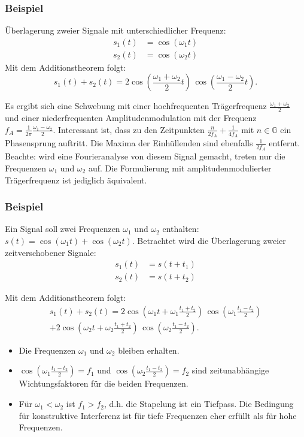 \subsubsection*{Beispiel}
Überlagerung zweier Signale mit unterschiedlicher Frequenz:
\begin{align*}
s_1(t) & = \cos(\omega_1 t)\\
s_2(t) &= \cos(\omega_2 t)
\end{align*}
Mit dem Additionstheorem folgt:
\begin{equation}
s_1(t)+s_2(t)= 2 \cos \left(\frac{\omega_1+\omega_2}{2}t\right)\, \cos \left(\frac{\omega_1-\omega_2}{2}t\right).
\end{equation}

Es ergibt sich eine Schwebung mit einer hochfrequenten Trägerfrequenz $\frac{\omega_1+\omega_2}{2}$ und einer niederfrequenten Amplitudenmodulation mit der Frequenz $f_A = \frac{1}{2\pi}\frac{\omega_1-\omega_2}{2}$. Interessant ist, dass zu den Zeitpunkten $\frac{n}{2f_A}+\frac{1}{4f_A}$ mit $n \in \mathbb{G}$ ein Phasensprung auftritt. Die Maxima der Einhüllenden sind ebenfalls $\frac{1}{2f_A}$ entfernt. Beachte: wird eine Fourieranalyse von diesem Signal gemacht, treten nur die Frequenzen $\omega_1$ und $\omega_2$ auf. Die Formulierung mit amplitudenmodulierter Trägerfrequenz ist jediglich äquivalent.\\ 

\subsubsection*{Beispiel}
Ein Signal soll zwei Frequenzen $\omega_1$ und $\omega_2$ enthalten: $s(t) = \cos (\omega_1t) + \cos(\omega_2t)$. Betrachtet wird die Überlagerung zweier zeitverschobener Signale:
\begin{align*}
s_1(t) &=s(t+t_1)\\
s_2(t) &=s(t+t_2)
\end{align*}

Mit dem Additionstheorem folgt:
\begin{multline}
s_1(t)+s_2(t)= 2 \cos \left(\omega_1 t +\omega_1\frac{t_1+t_2}{2}\right)\, \cos \left(\omega_1\frac{t_1-t_2}{2}\right)\\
+2 \cos \left(\omega_2 t +\omega_2\frac{t_1+t_2}{2}\right)\, \cos\left(\omega_2\frac{t_1-t_2}{2}\right).
\end{multline}

\begin{itemize}
\item Die Frequenzen $\omega_1$ und $\omega_2$ bleiben erhalten.
\item $\cos \left(\omega_1\frac{t_1-t_2}{2} \right)=f_1$ und $ \cos\left(\omega_2\frac{t_1-t_2}{2}\right)=f_2$ sind zeitunabhängige Wichtungsfaktoren für die beiden Frequenzen.
\item Für $\omega_1<\omega_2$ ist $f_1>f_2$, d.h. die Stapelung ist ein Tiefpass. Die Bedingung für konstruktive Interferenz ist für tiefe Frequenzen eher erfüllt als für hohe Frequenzen. 
\end{itemize}

